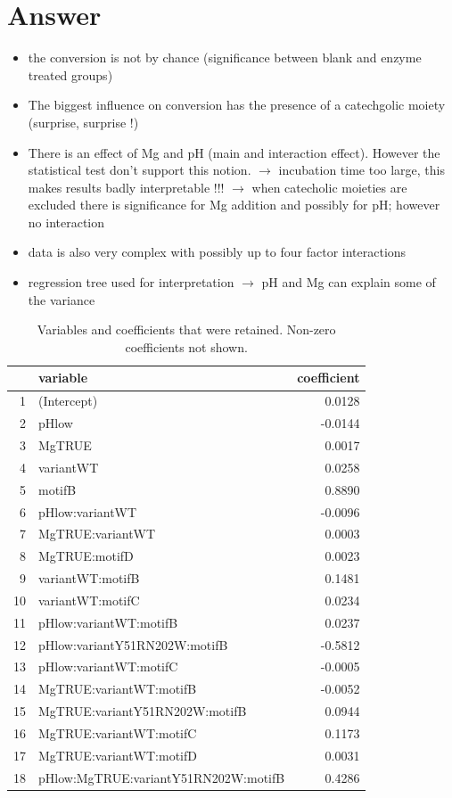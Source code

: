 \documentclass[]{tufte-handout}
\begin{document}
\section{Answer}\label{answer}

\begin{itemize}
\itemsep1pt\parskip0pt
\item
  the conversion is not by chance (significance between blank and enzyme
  treated groups)
\item
  The biggest influence on conversion has the presence of a catechgolic
  moiety (surprise, surprise !)
\item
  There is an effect of Mg and pH (main and interaction effect). However
  the statistical test don't support this notion. \(\rightarrow\)
  incubation time too large, this makes results badly interpretable !!!
  \(\rightarrow\) when catecholic moieties are excluded there is
  significance for Mg addition and possibly for pH; however no
  interaction
\item
  data is also very complex with possibly up to four factor interactions
\item
  regression tree used for interpretation \(\rightarrow\) pH and Mg can
  explain some of the variance
\end{itemize}

\begin{table}[ht]
\centering
\begin{tabular}{rlr}
  \toprule
 & variable & coefficient \\ 
  \midrule
1 & (Intercept) & 0.0128 \\ 
  2 & pHlow & -0.0144 \\ 
  3 & MgTRUE & 0.0017 \\ 
  4 & variantWT & 0.0258 \\ 
  5 & motifB & 0.8890 \\ 
  6 & pHlow:variantWT & -0.0096 \\ 
  7 & MgTRUE:variantWT & 0.0003 \\ 
  8 & MgTRUE:motifD & 0.0023 \\ 
  9 & variantWT:motifB & 0.1481 \\ 
  10 & variantWT:motifC & 0.0234 \\ 
  11 & pHlow:variantWT:motifB & 0.0237 \\ 
  12 & pHlow:variantY51RN202W:motifB & -0.5812 \\ 
  13 & pHlow:variantWT:motifC & -0.0005 \\ 
  14 & MgTRUE:variantWT:motifB & -0.0052 \\ 
  15 & MgTRUE:variantY51RN202W:motifB & 0.0944 \\ 
  16 & MgTRUE:variantWT:motifC & 0.1173 \\ 
  17 & MgTRUE:variantWT:motifD & 0.0031 \\ 
  18 & pHlow:MgTRUE:variantY51RN202W:motifB & 0.4286 \\ 
   \bottomrule
\end{tabular}
\caption{Variables and coefficients that were retained. Non-zero coefficients not shown.} 
\end{table}
\end{document}
